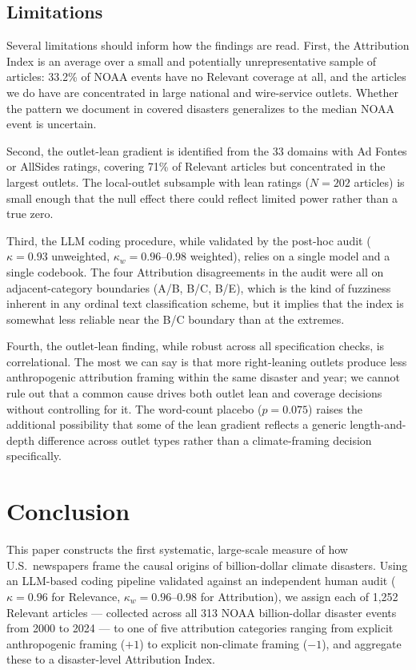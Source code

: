 \documentclass[12pt]{article}
\begin{document}
\subsection*{Limitations}

Several limitations should inform how the findings are read.  First,
the Attribution Index is an average over a small and potentially
unrepresentative sample of articles: 33.2\% of NOAA events have no
Relevant coverage at all, and the articles we do have are concentrated
in large national and wire-service outlets.  Whether the pattern we
document in covered disasters generalizes to the median NOAA event is
uncertain.

Second, the outlet-lean gradient is identified from the 33 domains with
Ad Fontes or AllSides ratings, covering 71\% of Relevant articles but
concentrated in the largest outlets.  The local-outlet subsample with
lean ratings ($N=202$ articles) is small enough that the null effect
there could reflect limited power rather than a true zero.

Third, the LLM coding procedure, while validated by the post-hoc audit
($\kappa = 0.93$ unweighted, $\kappa_w = 0.96$--$0.98$ weighted),
relies on a single model and a single codebook.  The four
Attribution disagreements in the audit were all on adjacent-category
boundaries (A/B, B/C, B/E), which is the kind of fuzziness inherent
in any ordinal text classification scheme, but it implies that the
index is somewhat less reliable near the B/C boundary than at the
extremes.

Fourth, the outlet-lean finding, while robust across all specification
checks, is correlational.  The most we can say is that more
right-leaning outlets produce less anthropogenic attribution framing
within the same disaster and year; we cannot rule out that a common
cause drives both outlet lean and coverage decisions without controlling
for it.  The word-count placebo ($p = 0.075$) raises the additional
possibility that some of the lean gradient reflects a generic
length-and-depth difference across outlet types rather than a
climate-framing decision specifically.


\section{Conclusion}

This paper constructs the first systematic, large-scale measure of how
U.S.\ newspapers frame the causal origins of billion-dollar climate
disasters.  Using an LLM-based coding pipeline validated against an
independent human audit ($\kappa = 0.96$ for Relevance,
$\kappa_w = 0.96$--$0.98$ for Attribution), we assign each of 1,252
Relevant articles --- collected across all 313 NOAA billion-dollar
disaster events from 2000 to 2024 --- to one of five attribution
categories ranging from explicit anthropogenic framing ($+1$) to
explicit non-climate framing ($-1$), and aggregate these to a
disaster-level Attribution Index.
\end{document}

